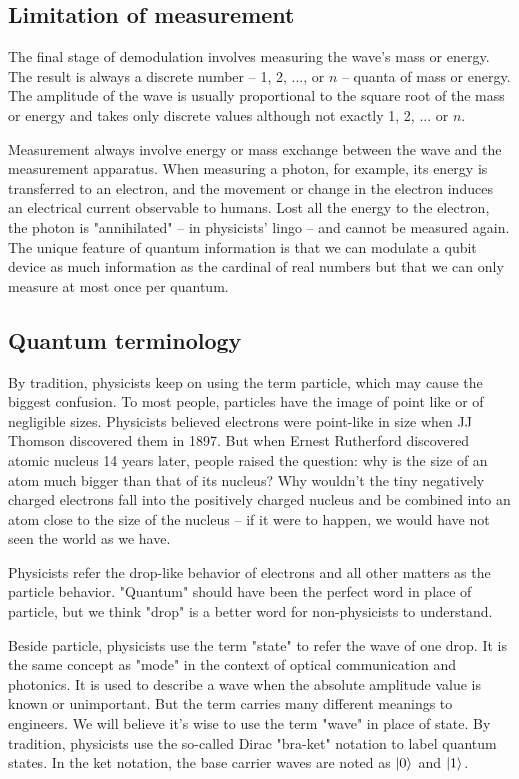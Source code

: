 \documentclass[Letter,11pt]{book}
\begin{document}
\subsection{Limitation of measurement}
The final stage of demodulation involves measuring the wave's mass or energy. The result is always a discrete number -- 1, 2, ..., or $n$ -- quanta of mass or energy. The amplitude of the wave is usually proportional to the square root of the mass or energy and takes only discrete values although not exactly 1, 2, ... or $n$.

Measurement always involve energy or mass exchange between the wave and the measurement apparatus. When measuring a photon, for example, its energy is transferred to an electron, and the movement or change in the electron induces an electrical current observable to humans. Lost all the energy to the electron, the photon is "annihilated" -- in physicists' lingo -- and cannot be measured again. The unique feature of quantum information is that we can modulate a qubit device as much information as the cardinal of real numbers but that we can only measure at most once per quantum.

\subsection{Quantum terminology}
By tradition, physicists keep on using the term particle, which may cause the biggest confusion. To most people, particles have the image of point like or of negligible sizes. Physicists believed electrons were point-like in size when JJ Thomson discovered them in 1897. But when Ernest Rutherford discovered atomic nucleus 14 years later, people raised the question: why is the size of an atom much bigger than that of its nucleus? Why wouldn't the tiny negatively charged electrons fall into the positively charged nucleus and be combined into an atom close to the size of the nucleus -- if it were to happen, we would have not seen the world as we have.

Physicists refer the drop-like behavior of electrons and all other matters as the particle behavior. "Quantum" should have been the perfect word in place of particle, but we think "drop" is a better word for non-physicists to understand.

Beside particle, physicists use the term "state" to refer the wave of one drop. It is the same concept as "mode" in the context of optical communication and photonics. It is used to describe a wave when the absolute amplitude value is known or unimportant. But the term carries many different meanings to engineers. We will believe it's wise to use the term "wave" in place of state. By tradition, physicists use the so-called Dirac "bra-ket" notation to label quantum states. In the ket notation, the base carrier waves are noted as $\vert {0} \rangle_{}$ and $\vert {1} \rangle_{}$.
\end{document}
